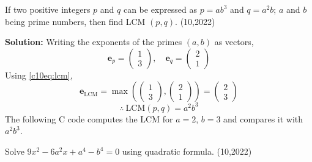 \item If two positive integers $p$ and $q$ can be expressed as $p = ab^3$ and $q = a^2b$; $a$ and $b$ being prime numbers, then find LCM $(p, q)$. \hfill (10,2022)

\textbf{Solution:} Writing the exponents of the primes $(a, b)$ as vectors,
\begin{equation}
\mathbf{e}_p = \begin{pmatrix} 1 \\ 3 \end{pmatrix}, \quad
\mathbf{e}_q = \begin{pmatrix} 2 \\ 1 \end{pmatrix}
\end{equation}
Using \eqref{c10eq:lcm},
\begin{equation}
\mathbf{e}_{\text{LCM}} = \max\left(\begin{pmatrix} 1 \\ 3 \end{pmatrix}, \begin{pmatrix} 2 \\ 1 \end{pmatrix}\right) = \begin{pmatrix} 2 \\ 3 \end{pmatrix}
\end{equation}
\begin{equation}
\therefore\ \text{LCM}(p, q) = a^2b^3
\end{equation}
The following C code computes the LCM for $a = 2$, $b = 3$ and compares it with $a^2b^3$.

\nopagebreak[4]
\begin{center}
\end{center}


\clearpage
\item Solve $9x^2 - 6a^2x + a^4 - b^4 = 0$ using quadratic formula. \hfill (10,2022)

